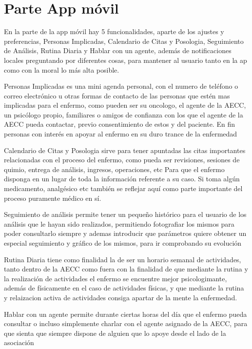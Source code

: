 \documentclass[b5paper,10pt,twoside]{book}
\begin{document}
	\section{Parte App móvil}
	
	En la parte de la app móvil hay 5 funcionalidades, aparte de los ajustes y preferencias, Personas Implicadas, Calendario de Citas y Posologia, Seguimiento de Análisis, Rutina Diaria y Hablar con un agente, además de notificaciones locales preguntando por diferentes cosas, para mantener al usuario tanto en la ap como con la moral lo más alta posible.
	
	Personas Implicadas es una mini agenda personal, con el numero de teléfono o correo electrónico u otras formas de contacto de las personas que estén mas implicadas para el enfermo, como pueden ser su oncologo, el agente de la AECC, un psicólogo propio, familiares o amigos de confianza con los que el agente de la AECC pueda contactar, previo consentimiento de estos y del paciente. En fin personas con interés en apoyar al enfermo en su duro trance de la enfermedad
	
	Calendario de Citas y Posologia sirve para tener apuntadas las citas importantes relacionadas con el proceso del enfermo, como pueda ser revisiones, sesiones de quimio, entrega de análisis, ingresos, operaciones, etc Para que el enfermo disponga en un lugar de toda la información referente a su caso. Si toma algún medicamento, analgésico etc también se reflejar aquí como parte importante del proceso puramente médico en sí.
	
	Seguimiento de análisis permite tener un pequeño histórico para el usuario de los análisis que le hayan sido realizados, permitiendo fotografiar los mismos para poder consultarlo siempre y ademas introducir que parámetros quiere obtener un especial seguimiento y gráfico de los mismos, para ir comprobando su evolución 
	
	Rutina Diaria tiene como finalidad la de ser un horario semanal de actividades, tanto dentro de la AECC como fuera con la finalidad de que mediante la rutina y la realización de actividades el enfermo se encuentre mejor psicologimante, además de físicamente en el caso de actividades físicas, y que mediante la rutina y relaizacion activa de actividades consiga apartar de la mente la enfermedad.
	
	Hablar con un agente permite durante ciertas horas del día que el enfermo pueda consultar o incluso simplemente charlar con el agente asignado de la AECC, para que sienta que siempre dispone de alguien que lo apoye desde el lado de la asociación 
	  
\end{document}
